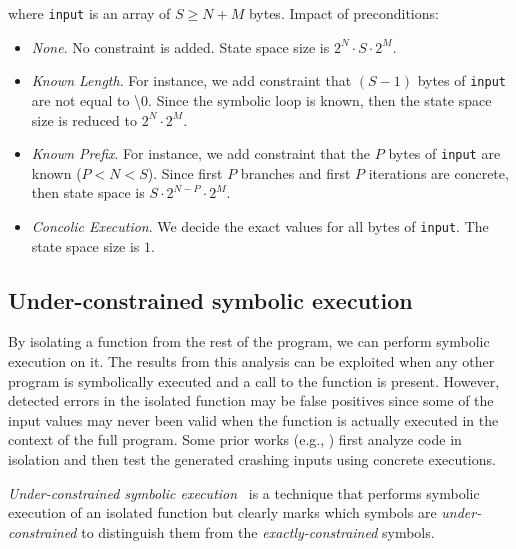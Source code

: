 where {\tt input} is an array of $S\ge N+M$ bytes. Impact of preconditions:
\begin{itemize}
  \item {\em None}. No constraint is added. State space size is $2^N \cdot S \cdot 2^M$.
  \item {\em Known Length}. For instance, we add constraint that $(S - 1)$ bytes of {\tt input} are not equal to \textbackslash0. Since the symbolic loop is known, then the state space size is reduced to $2^N \cdot 2^M$.
  \item {\em Known Prefix}. For instance, we add constraint that the $P$ bytes of {\tt input} are known ($P < N < S$). Since first $P$ branches and first $P$ iterations are concrete, then state space is $S \cdot 2^{N-P} \cdot 2^M$.
  \item {\em Concolic Execution}. We decide the exact values for all bytes of {\tt input}. The state space size is $1$.
\end{itemize}



\subsection{Under-constrained symbolic execution} 
\label{under-constrinained}

By isolating a function from the rest of the program, we can perform symbolic execution on it. The results from this analysis can be exploited when any other program is symbolically executed and a call to the function is present. However, detected errors in the isolated function may be false positives since some of the input values may never been valid when the function is actually executed in the context of the full program. Some prior works (e.g., \cite{CS-ICSE05}) first analyze code in isolation and then test the generated crashing inputs using concrete executions. 

{\em Under-constrained symbolic execution}~\cite{ED-ISSTA07} is a technique that performs symbolic execution of an isolated function but clearly marks which symbols are {\em under-constrained} to distinguish them from the {\em exactly-constrained} symbols.

